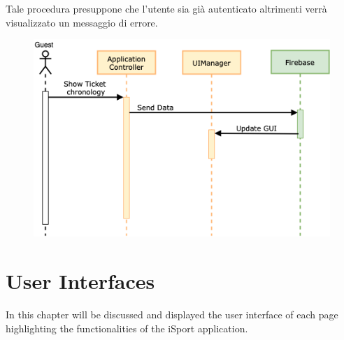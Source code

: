 \documentclass[numbers=noenddot, 12pt, a4paper, oneside]{scrbook}
\begin{document}
Tale procedura presuppone che l'utente sia già autenticato altrimenti verrà visualizzato un messaggio di errore.
\begin{figure}[H]
	\centering
	\includegraphics[width=1\textwidth]{images/Sequence/TicketChronology}
\end{figure}


\chapter{User Interfaces}
In this chapter will be discussed and displayed the user interface of each page highlighting the functionalities of the iSport application.
\end{document}
